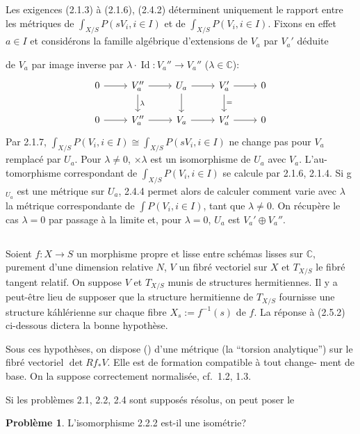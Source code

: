 \documentclass[12pt,a4paper]{article}
\theoremstyle{plain}
\theoremstyle{definition}
\newtheorem{probleme}[theorem]{Probl\`eme}
\DeclareMathOperator{\Id}{Id}
\newcommand{\CC}{\mathbb{C}}
\begin{document}
Les exigences (2.1.3) \`a (2.1.6), (2.4.2) d\'eterminent uniquement le rapport
entre les m\'etriques de $\int_{X/S} P(sV_i, i \in I)$ et de $\int_{X/S} P(V_i, i \in I)$. Fixons en effet
$a \in I$ et consid\'erons la famille alg\'ebrique d'extensions de $V_a$ par $V_a'$ d\'eduite

de $V_a$ par image inverse par $\lambda \cdot \Id: V_a'' \to V_a''$ ($\lambda \in \CC$):
\[
\begin{tikzcd}
0 \arrow[r] & V_a'' \arrow[r] \arrow[d, "\lambda"] & U_a \arrow[r] \arrow[d] & V_a' \arrow[r] \arrow[d, "="] & 0 \\
0 \arrow[r] & V_a'' \arrow[r] & V_a \arrow[r] & V_a' \arrow[r] & 0
\end{tikzcd}
\]
Par 2.1.7, $\int_{X/S} P(V_i, i \in I) \cong \int_{X/S} P(sV_i, i \in I)$ ne change pas pour $V_a$ remplac\'e
par $U_a$. Pour $\lambda \neq 0$, $\times \lambda$ est un isomorphisme de $U_a$ avec $V_a$. L'au-
tomorphisme correspondant de $\int_{X/S} P(V_i, i \in I)$ se calcule par 2.1.6, 2.1.4. Si
g$_{U_a}$ est une m\'etrique sur $U_a$, 2.4.4 permet alors de calculer comment varie
avec $\lambda$ la m\'etrique correspondante de $\int P(V_i, i \in I)$, tant que $\lambda \neq 0$. On
r\'ecup\`ere le cas $\lambda = 0$ par passage \`a la limite et, pour $\lambda = 0$, $U_a$ est
$V_a' \oplus V_a''$.

\subsection{}

Soient $f: X \to S$ un morphisme propre et lisse entre sch\'emas lisses sur $\CC$,
purement d'une dimension relative $N$, $V$ un fibr\'e vectoriel sur $X$ et $T_{X/S}$ le
fibr\'e tangent relatif. On suppose $V$ et $T_{X/S}$ munis de structures hermitiennes.
Il y a peut-\^etre lieu de supposer que la structure hermitienne de $T_{X/S}$ fournisse
une structure k\'ahl\'erienne sur chaque fibre $X_s := f^{-1}(s)$ de $f$. La r\'eponse \`a
(2.5.2) ci-dessous dictera la bonne hypoth\`ese.

Sous ces hypoth\`eses, on dispose (\cite{14}) d'une m\'etrique (la ``torsion analytique'')
sur le fibr\'e vectoriel $\det Rf_* V$. Elle est de formation compatible \`a tout change-
ment de base. On la suppose correctement normalis\'ee, cf.~1.2, 1.3.

Si les probl\`emes 2.1, 2.2, 2.4 sont suppos\'es r\'esolus, on peut poser le

\begin{probleme}
L'isomorphisme 2.2.2 est-il une isom\'etrie?
\end{probleme}
\end{document}
